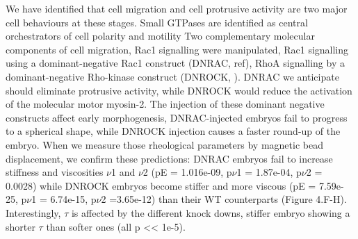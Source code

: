 We have identified that cell migration and cell protrusive activity are two major cell behaviours at these stages.
Small GTPases are identified as central orchestrators of cell polarity and motility %
Two complementary molecular components of cell migration, Rac1 signalling were manipulated,
Rac1 signalling using a dominant-negative Rac1 construct (DNRAC, ref), RhoA signalling by a dominant-negative Rho-kinase construct (DNROCK, %
).
DNRAC we anticipate should eliminate protrusive activity, while DNROCK would reduce the activation of the molecular motor myosin-2.
The injection of these dominant negative constructs affect early morphogenesis, DNRAC-injected embryos fail to progress to a spherical shape, while DNROCK injection causes a faster round-up of the embryo.
When we measure those rheological parameters by magnetic bead displacement, we confirm these predictions: DNRAC embryos fail to increase stiffness and viscosities $\nu$1 and $\nu$2 (pE = 1.016e-09, p$\nu$1 = 1.87e-04, p$\nu$2 = 0.0028) while DNROCK embryos become stiffer and more viscous (pE = 7.59e-25, p$\nu$1 = 6.74e-15, p$\nu$2 =3.65e-12) than their WT counterparts (Figure 4.F-H).
Interestingly, $\tau$ is affected by the different knock downs, stiffer embryo showing a shorter $\tau$ than softer ones (all p << 1e-5).

